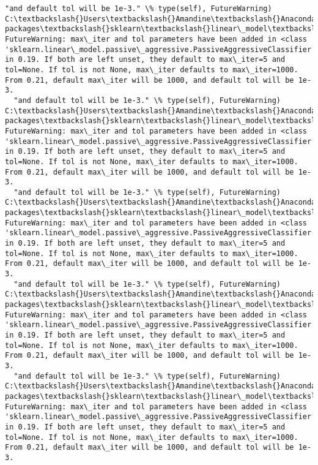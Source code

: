 \documentclass[11pt]{article}
\begin{document}
\begin{Verbatim}[commandchars=\\\{\}]
  "and default tol will be 1e-3." \% type(self), FutureWarning)
C:\textbackslash{}Users\textbackslash{}Amandine\textbackslash{}Anaconda3\textbackslash{}lib\textbackslash{}site-packages\textbackslash{}sklearn\textbackslash{}linear\_model\textbackslash{}stochastic\_gradient.py:128: FutureWarning: max\_iter and tol parameters have been added in <class 'sklearn.linear\_model.passive\_aggressive.PassiveAggressiveClassifier'> in 0.19. If both are left unset, they default to max\_iter=5 and tol=None. If tol is not None, max\_iter defaults to max\_iter=1000. From 0.21, default max\_iter will be 1000, and default tol will be 1e-3.
  "and default tol will be 1e-3." \% type(self), FutureWarning)
C:\textbackslash{}Users\textbackslash{}Amandine\textbackslash{}Anaconda3\textbackslash{}lib\textbackslash{}site-packages\textbackslash{}sklearn\textbackslash{}linear\_model\textbackslash{}stochastic\_gradient.py:128: FutureWarning: max\_iter and tol parameters have been added in <class 'sklearn.linear\_model.passive\_aggressive.PassiveAggressiveClassifier'> in 0.19. If both are left unset, they default to max\_iter=5 and tol=None. If tol is not None, max\_iter defaults to max\_iter=1000. From 0.21, default max\_iter will be 1000, and default tol will be 1e-3.
  "and default tol will be 1e-3." \% type(self), FutureWarning)
C:\textbackslash{}Users\textbackslash{}Amandine\textbackslash{}Anaconda3\textbackslash{}lib\textbackslash{}site-packages\textbackslash{}sklearn\textbackslash{}linear\_model\textbackslash{}stochastic\_gradient.py:128: FutureWarning: max\_iter and tol parameters have been added in <class 'sklearn.linear\_model.passive\_aggressive.PassiveAggressiveClassifier'> in 0.19. If both are left unset, they default to max\_iter=5 and tol=None. If tol is not None, max\_iter defaults to max\_iter=1000. From 0.21, default max\_iter will be 1000, and default tol will be 1e-3.
  "and default tol will be 1e-3." \% type(self), FutureWarning)
C:\textbackslash{}Users\textbackslash{}Amandine\textbackslash{}Anaconda3\textbackslash{}lib\textbackslash{}site-packages\textbackslash{}sklearn\textbackslash{}linear\_model\textbackslash{}stochastic\_gradient.py:128: FutureWarning: max\_iter and tol parameters have been added in <class 'sklearn.linear\_model.passive\_aggressive.PassiveAggressiveClassifier'> in 0.19. If both are left unset, they default to max\_iter=5 and tol=None. If tol is not None, max\_iter defaults to max\_iter=1000. From 0.21, default max\_iter will be 1000, and default tol will be 1e-3.
  "and default tol will be 1e-3." \% type(self), FutureWarning)
C:\textbackslash{}Users\textbackslash{}Amandine\textbackslash{}Anaconda3\textbackslash{}lib\textbackslash{}site-packages\textbackslash{}sklearn\textbackslash{}linear\_model\textbackslash{}stochastic\_gradient.py:128: FutureWarning: max\_iter and tol parameters have been added in <class 'sklearn.linear\_model.passive\_aggressive.PassiveAggressiveClassifier'> in 0.19. If both are left unset, they default to max\_iter=5 and tol=None. If tol is not None, max\_iter defaults to max\_iter=1000. From 0.21, default max\_iter will be 1000, and default tol will be 1e-3.

\end{Verbatim}
\end{document}
